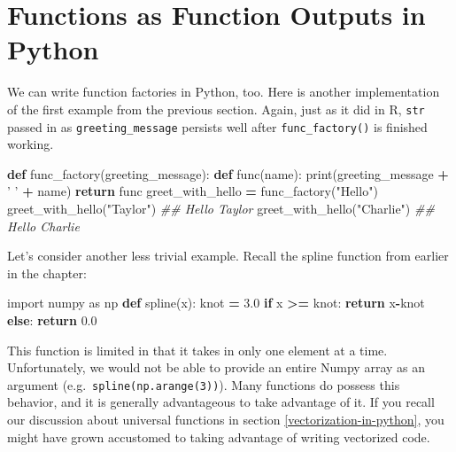 \documentclass[12pt,krantz2]{krantz}
\makeatletter
\newenvironment{Shaded}{\begin{snugshade}}{\end{snugshade}}
\newcommand{\BuiltInTok}[1]{#1}
\newcommand{\CommentTok}[1]{\textcolor[rgb]{0.37,0.37,0.37}{\textit{#1}}}
\newcommand{\ControlFlowTok}[1]{\textcolor[rgb]{0.27,0.27,0.27}{\textbf{#1}}}
\newcommand{\FloatTok}[1]{\textcolor[rgb]{0.06,0.06,0.06}{#1}}
\newcommand{\ImportTok}[1]{#1}
\newcommand{\KeywordTok}[1]{\textcolor[rgb]{0.27,0.27,0.27}{\textbf{#1}}}
\newcommand{\NormalTok}[1]{#1}
\newcommand{\OperatorTok}[1]{\textcolor[rgb]{0.43,0.43,0.43}{\textbf{#1}}}
\newcommand{\StringTok}[1]{\textcolor[rgb]{0.5,0.5,0.5}{#1}}
\newenvironment{kframe}{%
\medskip{}
\setlength{\fboxsep}{.8em}
 \def\at@end@of@kframe{}%
 \ifinner\ifhmode%
  \def\at@end@of@kframe{\end{minipage}}%
  \begin{minipage}{\columnwidth}%
 \fi\fi%
 \def\FrameCommand##1{\hskip\@totalleftmargin \hskip-\fboxsep
 \colorbox{shadecolor}{##1}\hskip-\fboxsep
     \hskip-\linewidth \hskip-\@totalleftmargin \hskip\columnwidth}%
 \MakeFramed {\advance\hsize-\width
   \@totalleftmargin\z@ \linewidth\hsize
   \@setminipage}}%
 {\par\unskip\endMakeFramed%
 \at@end@of@kframe}
\renewenvironment{Shaded}{\begin{kframe}}{\end{kframe}}
\makeatother
\begin{document}
\hypertarget{functions-as-function-outputs-in-python}{%
\section{Functions as Function Outputs in Python}\label{functions-as-function-outputs-in-python}}

We can write function factories in Python, too. Here is another implementation of the first example from the previous section. Again, just as it did in R, \texttt{str} passed in as \texttt{greeting\_message} persists well after \texttt{func\_factory()} is finished working.

\begin{Shaded}
\begin{Highlighting}[]
\KeywordTok{def}\NormalTok{ func_factory(greeting_message):}
    \KeywordTok{def}\NormalTok{ func(name):}
        \BuiltInTok{print}\NormalTok{(greeting_message }\OperatorTok{+} \StringTok{' '} \OperatorTok{+}\NormalTok{ name)}
    \ControlFlowTok{return}\NormalTok{ func}
\NormalTok{greet_with_hello }\OperatorTok{=}\NormalTok{ func_factory(}\StringTok{"Hello"}\NormalTok{)}
\NormalTok{greet_with_hello(}\StringTok{"Taylor"}\NormalTok{)}
\CommentTok{## Hello Taylor}
\NormalTok{greet_with_hello(}\StringTok{"Charlie"}\NormalTok{)}
\CommentTok{## Hello Charlie}
\end{Highlighting}
\end{Shaded}

Let's consider another less trivial example. Recall the spline function from earlier in the chapter:

\begin{Shaded}
\begin{Highlighting}[]
\ImportTok{import}\NormalTok{ numpy }\ImportTok{as}\NormalTok{ np}
\KeywordTok{def}\NormalTok{ spline(x):}
\NormalTok{    knot }\OperatorTok{=} \FloatTok{3.0}
    \ControlFlowTok{if}\NormalTok{ x }\OperatorTok{>=}\NormalTok{ knot:}
        \ControlFlowTok{return}\NormalTok{ x}\OperatorTok{-}\NormalTok{knot}
    \ControlFlowTok{else}\NormalTok{:}
        \ControlFlowTok{return} \FloatTok{0.0}
\end{Highlighting}
\end{Shaded}

This function is limited in that it takes in only one element at a time. Unfortunately, we would not be able to provide an entire Numpy array as an argument (e.g.~\texttt{spline(np.arange(3))}). Many functions do possess this behavior, and it is generally advantageous to take advantage of it. If you recall our discussion about universal functions in section \ref{vectorization-in-python}, you might have grown accustomed to taking advantage of writing vectorized code.
\end{document}
